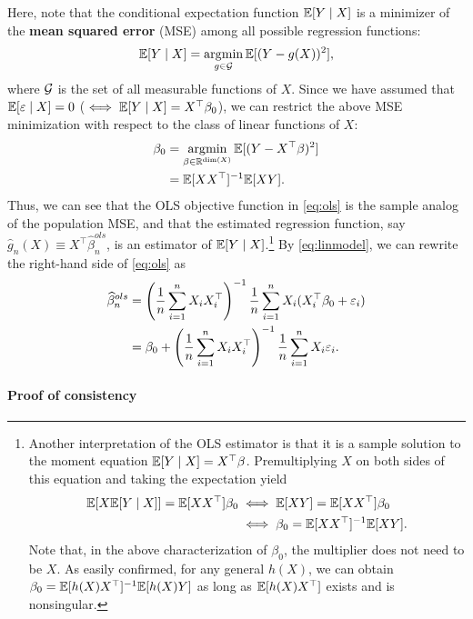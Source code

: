 \documentclass[11pt, A4paper, openany, uplatex]{book}
\begin{document}
Here, note that the conditional expectation function $\mathbb{E}[Y \mid X]$ is a minimizer of the \textbf{mean squared error} (MSE) among all possible regression functions:
\begin{align}\label{eq:msemin}
	\mathbb{E}[Y \mid X] = \operatorname*{\arg\!\min}_{g \in \mathcal{G}} \mathbb{E}[(Y - g(X))^2],
\end{align}
where $\mathcal{G}$ is the set of all measurable functions of $X$.
Since we have assumed that $\mathbb{E}[\varepsilon \mid X] = 0 $ ($\iff \mathbb{E} [Y \mid X] = X^\top \beta_0$), we can restrict the above MSE minimization with respect to the class of linear functions of $X$:
\begin{align*}
	\beta_0 
	& = \operatorname*{\arg\!\min}_{\beta \in \mathbb{R}^{\text{dim}(X)}} \mathbb{E}[(Y - X^\top \beta)^2]\\
	& = \mathbb{E}[XX^\top]^{-1} \mathbb{E}[XY].
\end{align*} 
Thus, we can see that the OLS objective function in \eqref{eq:ols} is the sample analog of the population MSE, and that the estimated regression function, say $\hat g_n(X) \equiv X^\top \hat \beta_n^{ols}$, is an estimator of $\mathbb{E}[Y \mid X]$.\footnote{\label{foot:ols_moment}
	Another interpretation of the OLS estimator is that it is a sample solution to the moment equation $\mathbb{E}[Y \mid X] = X^\top\beta$.
	Premultiplying $X$ on both sides of this equation and taking the expectation yield
	\begin{align*}
		\mathbb{E}[X \mathbb{E}[Y \mid X]] = \mathbb{E}[XX^\top]\beta_0
		& \iff \mathbb{E}[XY] = \mathbb{E}[XX^\top]\beta_0 \\
		& \iff \beta_0 = \mathbb{E}[XX^\top]^{-1}\mathbb{E}[XY].
	\end{align*}
	Note that, in the above characterization of $\beta_0$, the multiplier does not need to be $X$.
	As easily confirmed, for any general $h(X)$, we can obtain $\beta_0 = \mathbb{E}[h(X)X^\top]^{-1}\mathbb{E}[h(X)Y]$ as long as $\mathbb{E}[h(X)X^\top]$ exists and is nonsingular.
	}
	By \eqref{eq:linmodel}, we can rewrite the right-hand side of \eqref{eq:ols} as
\begin{align*}
	\widehat \beta_n^{ols} 
	& = \left(\frac{1}{n}\sum_{i = 1}^n X_i X_i^\top \right)^{-1}\frac{1}{n}\sum_{i = 1}^n X_i (X_i^\top\beta_0 + \varepsilon_i) \\
	& = \beta_0 + \left(\frac{1}{n}\sum_{i = 1}^n X_i X_i^\top \right)^{-1}\frac{1}{n}\sum_{i = 1}^n X_i \varepsilon_i.
\end{align*}

\paragraph{Proof of consistency}
\end{document}
